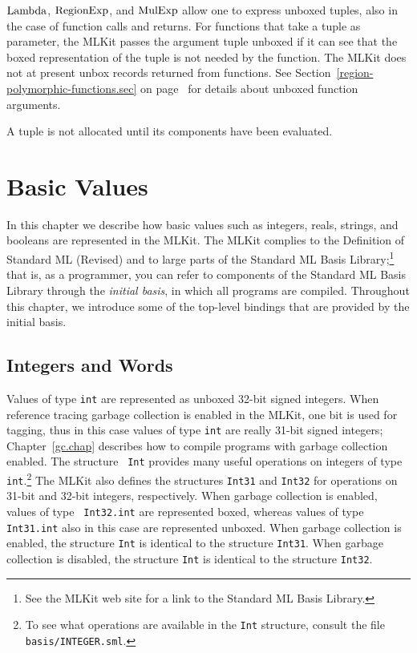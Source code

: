 \documentclass[12pt]{book}
\begin{document}
$\hbox{\rm Lambda}$, $\hbox{\rm RegionExp}$, and $\hbox{\rm MulExp}$ allow one to express unboxed tuples,
also in the case of function calls and returns. For functions that
take a tuple as parameter, the MLKit passes the argument tuple unboxed
%
%
%
%
if it can see that the boxed representation of the tuple is not needed
by the function. The MLKit does not at present unbox records returned
from functions. See Section~\ref{region-polymorphic-functions.sec} on
page~\pageref{region-polymorphic-functions.sec} for details about
unboxed function arguments.

A tuple is not allocated until its components have been evaluated.

\chapter{Basic Values}
In this chapter we describe how basic values such as integers, reals,
strings, and booleans are represented in the MLKit. The MLKit complies to
the Definition of Standard ML (Revised)
%
and to large parts of the Standard ML Basis
Library;\footnote{See the MLKit web site for a link to the Standard ML
  Basis Library.}
%
%
that is, as a programmer, you can refer to components of the Standard
ML Basis Library through the
%
{\em initial basis}, in which all programs are compiled.  Throughout
this chapter, we introduce some of the top-level bindings that are
provided by the initial basis.

\section{Integers and Words}
\label{integers.sec}
Values of type 
%
{\tt int} are represented as unboxed 32-bit signed integers. When
reference tracing garbage collection is enabled in the MLKit, one bit is
used for tagging, thus in this case values of type {\tt int} are
really 31-bit signed integers; Chapter~\ref{gc.chap} describes how to
compile programs with garbage collection enabled. The structure {\tt
  Int} provides many useful operations on integers of type {\tt
  int}.\footnote{To see what operations are available in the {\tt Int}
  structure, consult the file {\tt basis/INTEGER.sml}.}  The MLKit
also defines the structures 
%
{\tt Int31} and 
%
{\tt Int32} for operations on 31-bit and 32-bit integers,
respectively. When garbage collection is enabled, values of type {\tt
  Int32.int} are represented boxed, whereas values of type {\tt
  Int31.int} also in this case are represented unboxed. When garbage
collection is enabled, the structure {\tt Int} is identical to the
structure {\tt Int31}. When garbage collection is disabled, the
structure {\tt Int} is identical to the structure {\tt Int32}.
\end{document}
